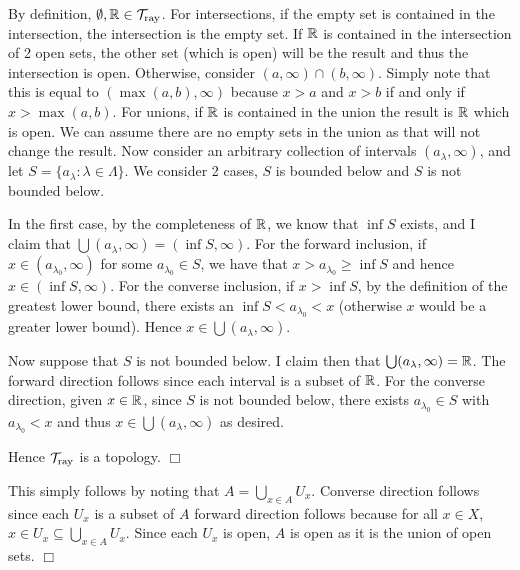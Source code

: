 \documentclass{article}
\begin{document}
 {
    By definition, $\emptyset, \mathbb{R} \in \mathcal{T}_{\text{ray}}$. For intersections, if the empty set is contained in the intersection, the intersection is the empty set. If $\mathbb{R}$ is contained in the intersection of 2 open sets, the other set (which is open) will be the result and thus the intersection is open. Otherwise, consider $(a,\infty) \cap (b,\infty)$. Simply note that this is equal to $(\max(a,b), \infty)$ because $x > a$ and $x > b$ if and only if $x > \max(a,b)$. For unions, if $\mathbb{R}$ is contained in the union the result is $\mathbb{R}$ which is open. We can assume there are no empty sets in the union as that will not change the result. Now consider an arbitrary collection of intervals $(a_{\lambda}, \infty)$, and let $S = \{a_{\lambda}: \lambda\in \Lambda\}$. We consider 2 cases, $S$ is bounded below and $S$ is not bounded below. 
    
    In the first case, by the completeness of $\mathbb{R}$, we know that $\inf S$ exists, and I claim that $\bigcup (a_{\lambda}, \infty) =  (\inf S, \infty)$. For the forward inclusion, if $x \in (a_{\lambda_{0}}, \infty)$ for some $a_{\lambda_{0}}\in S$, we have that $x >  a_{\lambda_{0}} \geq \inf S$ and hence $x\in (\inf S, \infty)$. For the converse inclusion, if $x > \inf S$, by the definition of the greatest lower bound, there exists an $\inf S < a_{\lambda_{0}} < x$ (otherwise $x$ would be a greater lower bound). Hence $x \in \bigcup (a_{\lambda}, \infty)$. 

    Now suppose that $S$ is not bounded below. I claim then that $\bigcup (a_{\lambda}, \infty) = \mathbb{R}$. The forward direction follows since each interval is a subset of $\mathbb{R}$. For the converse direction, given $x\in \mathbb{R}$, since $S$ is not bounded below, there exists $a_{\lambda_{0}} \in S$ with $a_{\lambda_{0}} < x$ and thus $x\in \bigcup (a_{\lambda}, \infty)$ as desired.

    Hence $\mathcal{T}_{\text{ray}}$ is a topology. $\Box$
}

 {
    This simply follows by noting that $A = \bigcup_{x\in A} U_{x}$. Converse direction follows since each $U_{x}$ is a subset of $A$ forward direction follows because for all $x\in X$, $x\in U_{x} \subseteq \bigcup_{x\in A} U_{x}$. Since each $U_{x}$ is open, $A$ is open as it is the union of open sets. $\Box$
}
\end{document}
